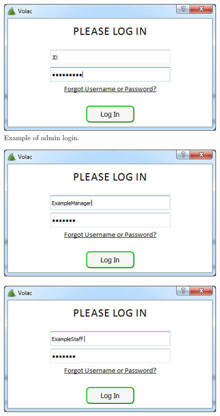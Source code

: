\begin{figure}[H]
    \includegraphics[width=\textwidth]{./Evaluation/Images/login2.png}
    \caption{Example of admin login.} 
\end{figure}

\begin{figure}[H]
    \includegraphics[width=\textwidth]{./Evaluation/Images/login3.png}
\end{figure}

\begin{figure}[H]
    \includegraphics[width=\textwidth]{./Evaluation/Images/login4.png}
\end{figure}

